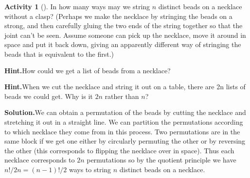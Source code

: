 \documentclass[10pt,]{book}
\theoremstyle{plain}
\theoremstyle{definition}
\newtheorem{activity}[project]{Activity}
\numberwithin{equation}{chapter}
\begin{document}
\begin{activity}[]\label{necklace}
In how many ways may we string \(n\) distinct beads on a necklace without a clasp? (Perhaps we make the necklace by stringing the beads on a strong, and then carefully gluing the two ends of the string together so that the joint can't be seen. Assume someone can pick up the necklace, move it around in space and put it back down, giving an apparently different way of stringing the beads that is equivalent to the first.)%
\par\medskip\noindent%
\textbf{Hint.}\quad How could we get a list of beads from a necklace?%
\par\medskip\noindent%
\textbf{Hint.}\quad When we cut the necklace and string it out on a table, there are 2n lists of beads we could get. Why is it \(2n\) rather than \(n\)?%
\par\medskip\noindent%
\textbf{Solution.}\quad We can obtain a permutation of the beads by cutting the necklace and stretching it out in a straight line. We can partition the permutations according to which necklace they come from in this process. Two permutations are in the same block if we get one either by circularly permuting the other or by reversing the other (this corresponds to flipping the necklace over in space). Thus each necklace corresponds to \(2n\) permutations so by the quotient principle we have \(n!/2n=(n-1)!/2\) ways to string \(n\) distinct beads on a necklace.%
\end{activity}
\end{document}
